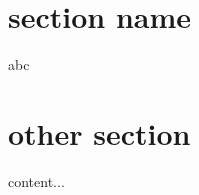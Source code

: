 \documentclass{beamer}
\begin{document}
\section{section name}
\begin{frame}
    abc
\end{frame} 

\section{other section}
\begin{frame}
content...
\end{frame}
\end{document}
